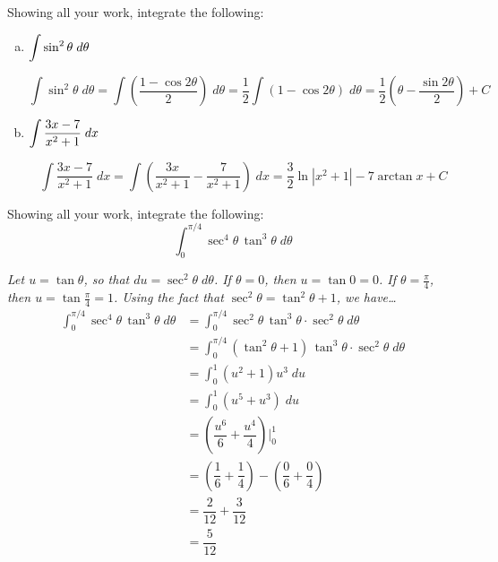 \documentclass[12pt,letterpaper]{exam}
\begin{document}
\begin{questions}

\newpage
\question[10] Showing all your work, integrate the following: \par\vspace{0.3cm}
	\begin{enumerate}[(a)]
	\item $\displaystyle\int \sin^2 \theta \;d\theta$ \par\vspace{3cm}
		\[
		\int \sin^2 \theta \;d\theta= \int \left( \dfrac{1 - \cos 2\theta}{2} \right) \;d\theta= \dfrac{1}{2} \int \left( 1 - \cos 2 \theta \right) \;d\theta= \dfrac{1}{2} \left( \theta - \dfrac{\sin 2\theta}{2} \right) + C
		\] \par\vspace{4.6cm}
	
	\item $\displaystyle\int \dfrac{3x - 7}{x^2 + 1} \;dx$ \par\vspace{3cm}
		\[
		\int \dfrac{3x - 7}{x^2 + 1} \;dx= \int \left( \dfrac{3x}{x^2 + 1} - \dfrac{7}{x^2 + 1} \right) \;dx= \dfrac{3}{2} \ln|x^2 + 1| - 7 \arctan x + C
		\] 
	\end{enumerate}



\newpage
\question[10] Showing all your work, integrate the following:
	\[
	\int_0^{\pi/4} \sec^4 \theta \, \tan^3 \theta \;d\theta
	\] \pspace

{\footnotesize \itshape \tsol Let $u= \tan \theta$, so that $du= \sec^2 \theta \;d\theta$. If $\theta= 0$, then $u= \tan 0= 0$. If $\theta= \frac{\pi}{4}$, then $u= \tan \frac{\pi}{4}= 1$. Using the fact that $\sec^2 \theta= \tan^2 \theta + 1$, we have\dots
	\[
	\begin{aligned}
	\int_0^{\pi/4} \sec^4 \theta \, \tan^3 \theta \;d\theta&= \int_0^{\pi/4} \sec^2 \theta \, \tan^3 \theta \cdot \sec^2 \theta \;d\theta \\
	&= \int_0^{\pi/4} (\tan^2 \theta + 1) \, \tan^3 \theta \cdot \sec^2 \theta \;d\theta \\
	&= \int_0^1 (u^2 + 1) u^3 \;du \\
	&= \int_0^1 (u^5 + u^3) \;du \\
	&= \left( \dfrac{u^6}{6} + \dfrac{u^4}{4} \right) \bigg|_0^1 \\
	&= \left( \dfrac{1}{6} + \dfrac{1}{4} \right) - \left( \dfrac{0}{6} + \dfrac{0}{4} \right) \\
	&= \dfrac{2}{12} + \dfrac{3}{12} \\
	&= \dfrac{5}{12}
	\end{aligned}
	\]
	
}
\end{questions}
\end{document}
